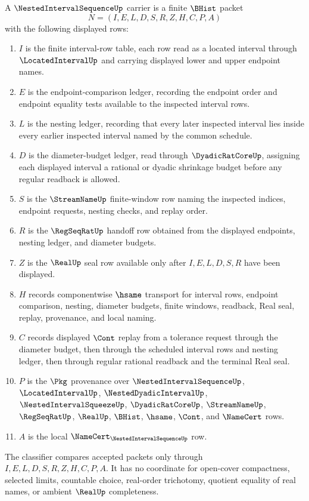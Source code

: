 \begin{definition}
\label{def:nested-interval-sequence-carrier}
A $\NestedIntervalSequenceUp$ carrier is a finite $\BHist$ packet
$$
N=(I,E,L,D,S,R,Z,H,C,P,A)
$$
with the following displayed rows:
\begin{enumerate}
\item $I$ is the finite interval-row table, each row read as a located interval through $\LocatedIntervalUp$ and carrying displayed lower and upper endpoint names.
\item $E$ is the endpoint-comparison ledger, recording the endpoint order and endpoint equality tests available to the inspected interval rows.
\item $L$ is the nesting ledger, recording that every later inspected interval lies inside every earlier inspected interval named by the common schedule.
\item $D$ is the diameter-budget ledger, read through $\DyadicRatCoreUp$, assigning each displayed interval a rational or dyadic shrinkage budget before any regular readback is allowed.
\item $S$ is the $\StreamNameUp$ finite-window row naming the inspected indices, endpoint requests, nesting checks, and replay order.
\item $R$ is the $\RegSeqRatUp$ handoff row obtained from the displayed endpoints, nesting ledger, and diameter budgets.
\item $Z$ is the $\RealUp$ seal row available only after $I,E,L,D,S,R$ have been displayed.
\item $H$ records componentwise $\hsame$ transport for interval rows, endpoint comparison, nesting, diameter budgets, finite windows, readback, Real seal, replay, provenance, and local naming.
\item $C$ records displayed $\Cont$ replay from a tolerance request through the diameter budget, then through the scheduled interval rows and nesting ledger, then through regular rational readback and the terminal Real seal.
\item $P$ is the $\Pkg$ provenance over $\NestedIntervalSequenceUp$, $\LocatedIntervalUp$, $\NestedDyadicIntervalUp$, $\NestedIntervalSqueezeUp$, $\DyadicRatCoreUp$, $\StreamNameUp$, $\RegSeqRatUp$, $\RealUp$, $\BHist$, $\hsame$, $\Cont$, and $\NameCert$ rows.
\item $A$ is the local $\NameCert_{\NestedIntervalSequenceUp}$ row.
\end{enumerate}
The classifier compares accepted packets only through $I,E,L,D,S,R,Z,H,C,P,A$. It has no coordinate for open-cover compactness, selected limits, countable choice, real-order trichotomy, quotient equality of real names, or ambient $\RealUp$ completeness.
\end{definition}

